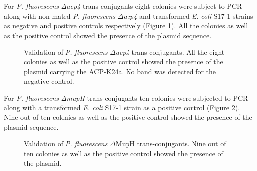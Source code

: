 	For \textit{P. fluorescens} $ \Delta $\textit{acp4} trans conjugants eight colonies were subject to PCR along with non mated \textit{P. fluorescens} $ \Delta $\textit{acp4} and transformed \textit{E. coli} S17-1 strains as negative and positive controls respectively (Figure \ref{fig:delta4conju}). All the colonies as well as the positive control showed the presence of the plasmid sequence. 
	
		\setlength\fboxsep{5pt}
		\setlength\fboxrule{1.5pt}
		\begin{figure}[htbp]
		\centering
		\caption[Validation of \textit{P. fluorescens} $ \Delta $\textit{acp4} trans-conjugants.]{Validation of \textit{P. fluorescens} $ \Delta $\textit{acp4} trans-conjugants. All the eight colonies as well as the positive control showed the presence of the plasmid carrying the ACP-K24a. No band was detected for the negative control.}
		\label{fig:delta4conju}
		\end{figure}		
		
	For \textit{P. fluorescens} $ \Delta $\textit{mupH} trans-conjugants ten colonies were subjected to PCR along with a transformed \textit{E. coli} S17-1 strain as a positive control (Figure \ref{fig:deltahconju}). Nine out of ten colonies as well as the positive control showed the presence of the plasmid sequence.

		\setlength\fboxsep{5pt}
		\setlength\fboxrule{1.5pt}
		\begin{figure}[htbp]
		\centering
		\caption[Validation of \textit{P. fluorescens} $ \Delta $MupH trans-conjugants.]{Validation of \textit{P. fluorescens} $ \Delta $MupH trans-conjugants. Nine out of ten colonies as well as the positive control showed the presence of the plasmid.}
		\label{fig:deltahconju}
		\end{figure}

